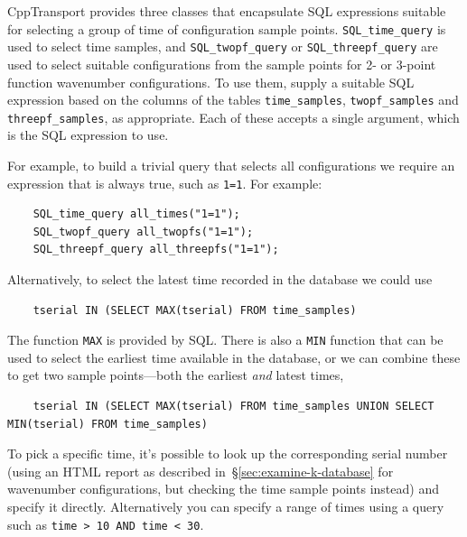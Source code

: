 \documentclass[11pt,a4paper]{article}
\newcommand{\packagefont}{\sffamily}
\newcommand{\CppTransport}{{\packagefont CppTransport}}
\newcommand{\semibold}[1]{{\fontseries{b}\selectfont{#1}}}
\newcommand{\para}[1]{\par\vspace{2mm}\noindent\semibold{{#1.}---}\ignorespaces}
\begin{document}
{\CppTransport} provides three classes that encapsulate SQL expressions suitable
for selecting a group of time of configuration sample points.
\texttt{SQL_time_query} is used to select time samples,
and
\texttt{SQL_twopf_query}
or \texttt{SQL_threepf_query}
are used to select suitable configurations from the sample points
for 2- or 3-point function wavenumber configurations.
To use them, supply a suitable SQL expression based on the columns
of the tables
\texttt{time_samples},
\texttt{twopf_samples}
and
\texttt{threepf_samples},
as appropriate.
Each of these accepts a single argument, which is the SQL
expression to use.

\para{Selecting times}
For example, to build a trivial query that selects all configurations
we require an expression that is always true, such as
\texttt{1=1}.
For example:
\begin{verbatim}
	SQL_time_query all_times("1=1");
	SQL_twopf_query all_twopfs("1=1");
	SQL_threepf_query all_threepfs("1=1");	
\end{verbatim}
Alternatively, to select the latest time recorded in the database
we could use
\begin{verbatim}
	tserial IN (SELECT MAX(tserial) FROM time_samples)
\end{verbatim}
The function \texttt{MAX} is provided by SQL.
There is also a \texttt{MIN} function that can be used to select
the earliest time available in the database,
or we can combine these to get two sample points---both the earliest \emph{and}
latest times,
\begin{verbatim}
	tserial IN (SELECT MAX(tserial) FROM time_samples UNION SELECT MIN(tserial) FROM time_samples)
\end{verbatim}
To pick a specific time, it's possible to look up the corresponding serial
number (using an HTML report as described in~\S\ref{sec:examine-k-database}
for wavenumber configurations, but checking the time sample points instead)
and specify it directly.
Alternatively you can specify a range of times using a query such as
\texttt{time > 10 AND time < 30}.
\end{document}
